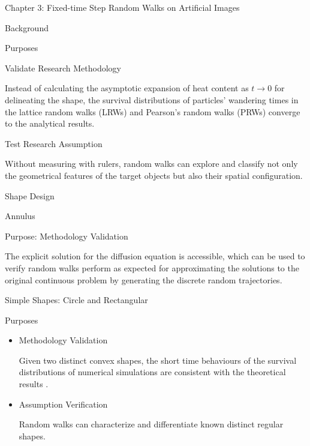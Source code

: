 \documentclass{article}
\begin{document}
\begin{outline}[enumerate]
  \par

  \centering
      {\Large Chapter 3: Fixed-time Step Random Walks on Artificial Images}

    \1 Background

        \2 Purposes

           \3 Validate Research Methodology
             \par
             Instead of calculating the asymptotic expansion of heat content as $t \rightarrow 0$ for delineating the shape, the survival distributions of particles' wandering times in the lattice random walks (LRWs) and Pearson's random walks (PRWs) converge to the analytical results.
               
           \3 Test Research Assumption
             \par
             Without measuring with rulers, random walks can explore and classify not only the geometrical features of the target objects but also their spatial configuration.

        \2 Shape Design
    
           \3 Annulus  
              
             \4 Purpose: Methodology Validation
               \par 
                The explicit solution for the diffusion equation is accessible, which can be used to verify random walks perform as expected for approximating the solutions to the original continuous problem by generating the discrete random trajectories.
               
           \3 Simple Shapes: Circle and Rectangular
               
             \4 Purposes
               \begin{itemize}
                 \item Methodology Validation
                   \par
                    Given two distinct convex shapes, the short time behaviours of the survival distributions of numerical simulations are consistent with the theoretical results \cite{DesjardinsS1994HAFO}.
                 \item Assumption Verification
                   \par
                    Random walks can characterize and differentiate known distinct regular shapes.
               \end{itemize}
              

\end{outline}
\end{document}
